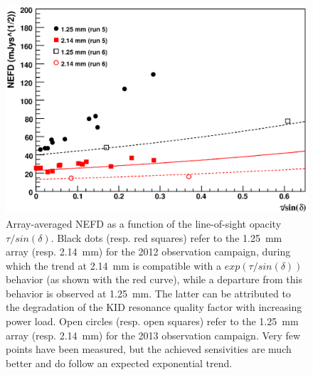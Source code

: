 \begin{figure}[t]
\begin{center}
\includegraphics[scale=0.45]{figures/plotNEFD.eps}
\caption{Array-averaged NEFD as a function of the line-of-sight opacity $\tau/
sin(\delta)$. Black dots (resp. red squares) refer to the 1.25~mm array (resp. 2.14~mm) for the 2012 observation campaign, during which 
the trend at  2.14~mm is compatible with a $exp(\tau/sin(\delta))$ behavior (as shown with the red curve),
 while a departure from this behavior is observed at  1.25~mm. The latter can be attributed to the  degradation of the KID resonance quality
  factor with increasing power load. Open circles (resp. open squares) refer to the 1.25~mm array (resp. 2.14~mm) for the 2013 observation campaign. Very few points have been measured,  but the achieved sensivities are much better and do follow an expected exponential 
  trend.}
\label{fig:NEFDfull}
\end{center}
\end{figure}


